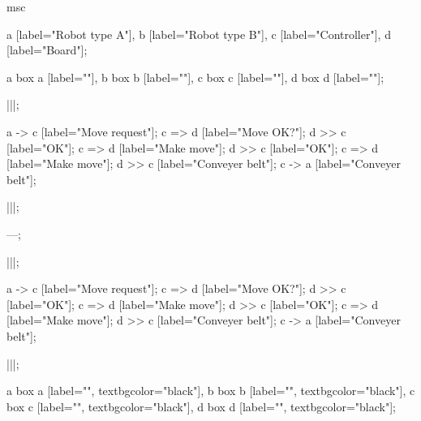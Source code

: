 msc
{

a [label="Robot type A"],
b [label="Robot type B"],
c [label="Controller"],
d [label="Board"];

a box a [label=""],
b box b [label=""],
c box c [label=""],
d box d [label=""];

|||;

a -> c [label="Move request"];
c => d [label="Move OK?"];
d >> c [label="OK"];
c => d [label="Make move"];
d >> c [label="OK"];
c => d [label="Make move"];
d >> c [label="Conveyer belt"];
c -> a [label="Conveyer belt"];

|||;

---;

|||;

a -> c [label="Move request"];
c => d [label="Move OK?"];
d >> c [label="OK"];
c => d [label="Make move"];
d >> c [label="OK"];
c => d [label="Make move"];
d >> c [label="Conveyer belt"];
c -> a [label="Conveyer belt"];

|||;

a box a [label="", textbgcolor="black"],
b box b [label="", textbgcolor="black"],
c box c [label="", textbgcolor="black"],
d box d [label="", textbgcolor="black"];

}